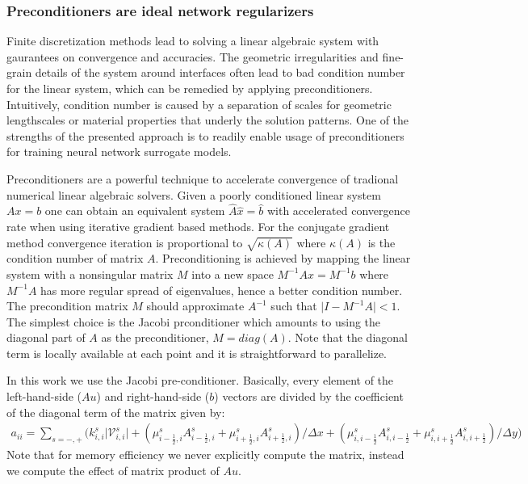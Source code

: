 \documentclass{elsarticle}
\begin{document}
\subsubsection{Preconditioners are ideal network regularizers}
Finite discretization methods lead to solving a linear algebraic system with gaurantees on convergence and accuracies. The geometric irregularities and fine-grain details of the system around interfaces often lead to bad condition number for the linear system, which can be remedied by applying preconditioners. Intuitively, condition number is caused by a separation of scales for geometric lengthscales or material properties that underly the solution patterns. One of the strengths of the presented approach is to readily enable usage of preconditioners for training neural network surrogate models.

Preconditioners are a powerful technique to accelerate convergence of tradional numerical linear algebraic solvers. Given a poorly conditioned linear system $Ax=b$ one can obtain an equivalent system $\hat{A}\hat{x}=\hat{b}$ with accelerated convergence rate when using iterative gradient based methods. For the conjugate gradient method convergence iteration is proportional to $\sqrt{\kappa(A)}$ where $\kappa(A)$ is the condition number of matrix $A$. Preconditioning is achieved by mapping the linear system with a nonsingular matrix $M$ into a new space $M^{-1} A x = M^{-1}b$ where $M^{-1}A$ has more regular spread of eigenvalues, hence a better condition number. The precondition matrix $M$ should approximate $A^{-1}$ such that $\vert I - M^{-1}A\vert < 1$. The simplest choice is the Jacobi prconditioner which amounts to using the diagonal part of $A$ as the preconditioner, $M=diag(A)$. Note that the diagonal term is locally available at each point and it is straightforward to parallelize.



In this work we use the Jacobi pre-conditioner. Basically, every element of the left-hand-side ($A u$) and right-hand-side ($b$) vectors are divided by the coefficient of the diagonal term of the matrix given by:
\begin{align*}
a_{ii} = \sum_{s=-,+} \bigg( k_{i,i}^s \vert \mathcal{V}_{i,i}^s\vert + (\mu_{i-\frac{1}{2},i}^s A_{i-\frac{1}{2},i}^s +  \mu_{i+\frac{1}{2},i}^s A_{i+\frac{1}{2},i}^s ) / \Delta x 
+  (\mu_{i, i-\frac{1}{2}}^s A_{i, i-\frac{1}{2}}^s +  \mu_{i, i+\frac{1}{2}}^s A_{i, i+\frac{1}{2}}^s ) / \Delta y \bigg)
\end{align*}
Note that for memory efficiency we never explicitly compute the matrix, instead we compute the effect of matrix product of $A u$.  
\end{document}
